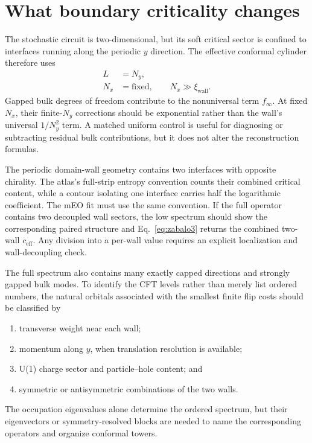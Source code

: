 \documentclass[aps,prb,twocolumn,floatfix,nofootinbib,superscriptaddress]{revtex4-2}
\begin{document}
\section{What boundary criticality changes}

The stochastic circuit is two-dimensional, but its soft critical sector is confined to interfaces running along the periodic \(y\) direction.  The effective conformal cylinder therefore uses
\begin{align}
 L&=N_y,\\
 N_x&=\text{fixed},\qquad N_x\gg\xi_{\mathrm{wall}}.
 \label{eq:boundary-geometry}
\end{align}
Gapped bulk degrees of freedom contribute to the nonuniversal term \(f_\infty\).  At fixed \(N_x\), their finite-\(N_y\) corrections should be exponential rather than the wall's universal \(1/N_y^2\) term.  A matched uniform control is useful for diagnosing or subtracting residual bulk contributions, but it does not alter the reconstruction formulas.

The periodic domain-wall geometry contains two interfaces with opposite chirality.  The atlas's full-strip entropy convention counts their combined critical content, while a contour isolating one interface carries half the logarithmic coefficient.  The mEO fit must use the same convention.  If the full operator contains two decoupled wall sectors, the low spectrum should show the corresponding paired structure and Eq.~\eqref{eq:zabalo3} returns the combined two-wall \(c_{\mathrm{eff}}\).  Any division into a per-wall value requires an explicit localization and wall-decoupling check.

The full spectrum also contains many exactly capped directions and strongly gapped bulk modes.  To identify the CFT levels rather than merely list ordered numbers, the natural orbitals associated with the smallest finite flip costs should be classified by
\begin{enumerate}
 \item transverse weight near each wall;
 \item momentum along \(y\), when translation resolution is available;
 \item U(1) charge sector and particle--hole content; and
 \item symmetric or antisymmetric combinations of the two walls.
\end{enumerate}
The occupation eigenvalues alone determine the ordered spectrum, but their eigenvectors or symmetry-resolved blocks are needed to name the corresponding operators and organize conformal towers.
\end{document}
